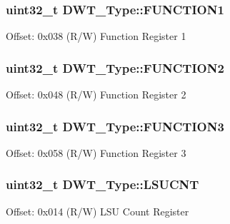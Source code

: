 \subsubsection[{\texorpdfstring{F\+U\+N\+C\+T\+I\+O\+N1}{FUNCTION1}}]{ uint32\+\_\+t D\+W\+T\+\_\+\+Type\+::\+F\+U\+N\+C\+T\+I\+O\+N1}\hypertarget{struct_d_w_t___type_a3345a33476ee58e165447a3212e6d747}{}\label{struct_d_w_t___type_a3345a33476ee58e165447a3212e6d747}
Offset\+: 0x038 (R/W) Function Register 1 
\subsubsection[{\texorpdfstring{F\+U\+N\+C\+T\+I\+O\+N2}{FUNCTION2}}]{ uint32\+\_\+t D\+W\+T\+\_\+\+Type\+::\+F\+U\+N\+C\+T\+I\+O\+N2}\hypertarget{struct_d_w_t___type_acba1654190641a3617fcc558b5e3f87b}{}\label{struct_d_w_t___type_acba1654190641a3617fcc558b5e3f87b}
Offset\+: 0x048 (R/W) Function Register 2 
\subsubsection[{\texorpdfstring{F\+U\+N\+C\+T\+I\+O\+N3}{FUNCTION3}}]{ uint32\+\_\+t D\+W\+T\+\_\+\+Type\+::\+F\+U\+N\+C\+T\+I\+O\+N3}\hypertarget{struct_d_w_t___type_a80bd242fc05ca80f9db681ce4d82e890}{}\label{struct_d_w_t___type_a80bd242fc05ca80f9db681ce4d82e890}
Offset\+: 0x058 (R/W) Function Register 3 
\subsubsection[{\texorpdfstring{L\+S\+U\+C\+NT}{LSUCNT}}]{ uint32\+\_\+t D\+W\+T\+\_\+\+Type\+::\+L\+S\+U\+C\+NT}\hypertarget{struct_d_w_t___type_aeba92e6c7fd3de4ba06bfd94f47f5b35}{}\label{struct_d_w_t___type_aeba92e6c7fd3de4ba06bfd94f47f5b35}
Offset\+: 0x014 (R/W) L\+SU Count Register 
